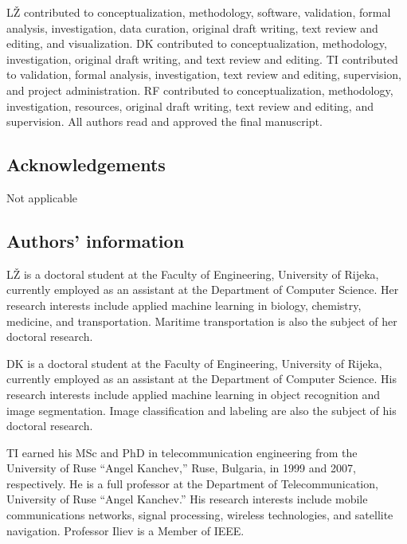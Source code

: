 \let\LaTeXcline\cline\documentclass[sn-mathphys-num]{sn-jnl}\let\cline\LaTeXcline
\begin{document}
L\v{Z} contributed to conceptualization, methodology, software, validation, formal analysis, investigation, data curation, original draft writing, text review and editing, and visualization. DK contributed to conceptualization, methodology, investigation, original draft writing, and text review and editing. TI contributed to validation, formal analysis, investigation, text review and editing, supervision, and project administration. RF contributed to conceptualization, methodology, investigation, resources, original draft writing, text review and editing, and supervision. All authors read and approved the final manuscript.

\subsection{Acknowledgements}

Not applicable

\subsection{Authors' information}

L\v{Z} is a doctoral student at the Faculty of Engineering, University of Rijeka, currently employed as an assistant at the Department of Computer Science. Her research interests include applied machine learning in biology, chemistry, medicine, and transportation. Maritime transportation is also the subject of her doctoral research.

DK is a doctoral student at the Faculty of Engineering, University of Rijeka, currently employed as an assistant at the Department of Computer Science. His research interests include applied machine learning in object recognition and image segmentation. Image classification and labeling are also the subject of his doctoral research.

TI earned his MSc and PhD in telecommunication engineering from the University of Ruse “Angel Kanchev,” Ruse, Bulgaria, in 1999 and 2007, respectively. He is a full professor at the Department of Telecommunication, University of Ruse “Angel Kanchev.” His research interests include mobile communications networks, signal processing, wireless technologies, and satellite navigation. Professor Iliev is a Member of IEEE.
\end{document}
